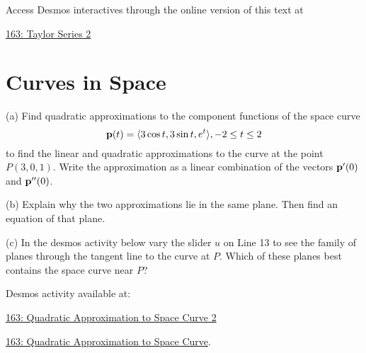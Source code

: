 \documentclass{ximera}
\begin{document}
\begin{exploration}\label{Exp3:Comp}

 
\begin{onlineOnly}
    \begin{center}
\end{center}
\end{onlineOnly}

Access Desmos interactives through the online version of this text at
 
\href{https://www.desmos.com/calculator/oswisy36tn}{163: Taylor Series 2}


\end{exploration}





\section{Curves in Space}


\begin{question}  \label{Qgtyhtsry}
(a) Find quadratic approximations to the component functions of the space curve
\[
   {\bf p}(t) = \langle  3 \cos t, 3\sin t, e^t \rangle , -2\leq t \leq 2
\]
to find the linear and quadratic approximations to the curve at the point $P(3,0,1)$. Write the approximation as a linear combination of the vectors ${\bf p}^\prime(0)$ and ${\bf p}^{\prime\prime}(0)$.

(b) Explain why the two approximations lie in the same plane. Then find an equation of that plane.

(c) In the desmos activity below vary the slider $u$ on Line 13 to see the family of planes through the tangent line to the curve at $P$. Which of these planes best contains the space curve near $P$?

Desmos activity available at:

\href{https://www.desmos.com/3d/196e85fe1a}{163: Quadratic Approximation to Space Curve 2}


\href{https://www.desmos.com/3d/a263cd2883}{163: Quadratic Approximation to Space Curve}.

 

\end{question}
\end{document}
